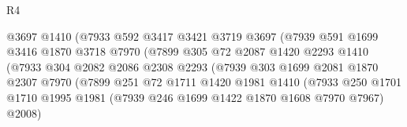 \begin{lexlean}{R4}
\begin{coremodule}
                                      @3697
                                      @1410
                                      (@7933
                                        @592
                                        @3417
                                        @3421
                                        @3719
                                        @3697
                                        (@7939
                                          @591
                                          @1699
                                          @3416
                                          @1870
                                          @3718
                                          @7970
                                          (@7899
                                            @305
                                            @72
                                            @2087
                                            @1420
                                            @2293
                                            @1410
                                            (@7933
                                              @304
                                              @2082
                                              @2086
                                              @2308
                                              @2293
                                              (@7939
                                                @303
                                                @1699
                                                @2081
                                                @1870
                                                @2307
                                                @7970
                                                (@7899
                                                  @251
                                                  @72
                                                  @1711
                                                  @1420
                                                  @1981
                                                  @1410
                                                  (@7933
                                                    @250
                                                    @1701
                                                    @1710
                                                    @1995
                                                    @1981
                                                    (@7939 @246 @1699 @1422 @1870 @1608 @7970 @7967)
                                                    @2008)

\end{coremodule}
\end{lexlean}
